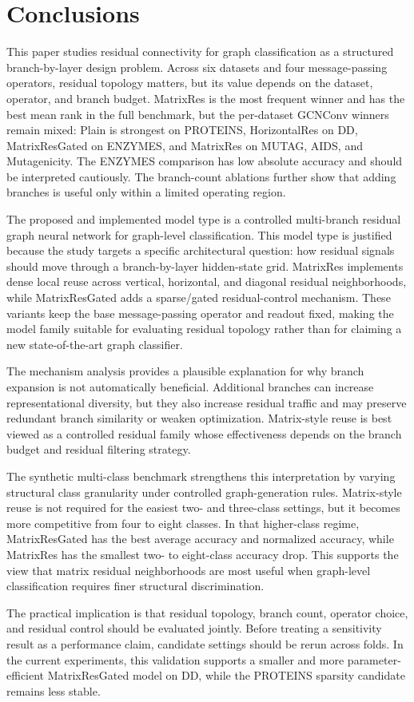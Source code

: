 \section{Conclusions}
\label{sec:conclusion}

This paper studies residual connectivity for graph classification as a structured branch-by-layer design problem. Across six datasets and four message-passing operators, residual topology matters, but its value depends on the dataset, operator, and branch budget. MatrixRes is the most frequent winner and has the best mean rank in the full benchmark, but the per-dataset GCNConv winners remain mixed: Plain is strongest on PROTEINS, HorizontalRes on DD, MatrixResGated on ENZYMES, and MatrixRes on MUTAG, AIDS, and Mutagenicity. The ENZYMES comparison has low absolute accuracy and should be interpreted cautiously. The branch-count ablations further show that adding branches is useful only within a limited operating region.

The proposed and implemented model type is a controlled multi-branch residual graph neural network for graph-level classification. This model type is justified because the study targets a specific architectural question: how residual signals should move through a branch-by-layer hidden-state grid. MatrixRes implements dense local reuse across vertical, horizontal, and diagonal residual neighborhoods, while MatrixResGated adds a sparse/gated residual-control mechanism. These variants keep the base message-passing operator and readout fixed, making the model family suitable for evaluating residual topology rather than for claiming a new state-of-the-art graph classifier.

The mechanism analysis provides a plausible explanation for why branch expansion is not automatically beneficial. Additional branches can increase representational diversity, but they also increase residual traffic and may preserve redundant branch similarity or weaken optimization. Matrix-style reuse is best viewed as a controlled residual family whose effectiveness depends on the branch budget and residual filtering strategy.

The synthetic multi-class benchmark strengthens this interpretation by varying structural class granularity under controlled graph-generation rules. Matrix-style reuse is not required for the easiest two- and three-class settings, but it becomes more competitive from four to eight classes. In that higher-class regime, MatrixResGated has the best average accuracy and normalized accuracy, while MatrixRes has the smallest two- to eight-class accuracy drop. This supports the view that matrix residual neighborhoods are most useful when graph-level classification requires finer structural discrimination.

The practical implication is that residual topology, branch count, operator choice, and residual control should be evaluated jointly. Before treating a sensitivity result as a performance claim, candidate settings should be rerun across folds. In the current experiments, this validation supports a smaller and more parameter-efficient MatrixResGated model on DD, while the PROTEINS sparsity candidate remains less stable.

